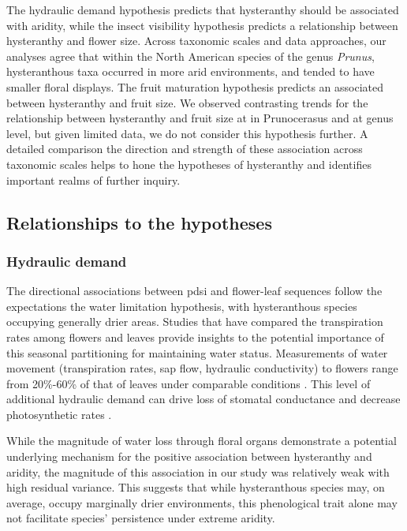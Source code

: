 \documentclass{article}[11pt]
\begin{document}
The hydraulic demand hypothesis predicts that hysteranthy should be associated with aridity, while the insect visibility hypothesis predicts a relationship between hysteranthy and flower size. Across taxonomic scales and data approaches, our analyses agree that within the North American species of the genus \emph{Prunus}, hysteranthous taxa occurred in more arid environments, and tended to have smaller floral displays. The fruit maturation hypothesis predicts an associated between hysteranthy and fruit size. We observed contrasting trends for the relationship between hysteranthy and fruit size at in Prunocerasus and  at genus level, but given limited data, we do not consider this hypothesis further. %
A detailed comparison the direction and strength of these association across taxonomic scales helps to hone the hypotheses of hysteranthy and identifies important realms of further inquiry. 
\subsection*{Relationships to the hypotheses}
\subsubsection*{Hydraulic demand}
The directional associations between pdsi and flower-leaf sequences follow the expectations the water limitation hypothesis, with hysteranthous species occupying generally drier areas. Studies that have compared the transpiration rates among flowers and leaves provide insights to the potential importance of this seasonal partitioning for maintaining water status. Measurements of water movement (transpiration rates, sap flow, hydraulic conductivity) to flowers range from 20\%-60\% of that of leaves under comparable conditions \citep{Whiley:1988uf,Roddy:2012wn,Liu:2017wg,McMann:2022ww}. This level of additional hydraulic demand can drive loss of stomatal conductance and decrease photosynthetic rates \citep{Galen:1999vr}. 

While the magnitude of water loss through floral organs demonstrate a potential underlying mechanism for the positive association between hysteranthy and aridity, the magnitude of this association in our study was relatively  weak with high residual variance.  This suggests that while hysteranthous species may, on average, occupy marginally drier environments, this phenological trait alone may not facilitate species' persistence under extreme aridity. 
\end{document}
